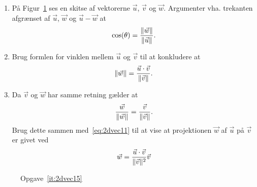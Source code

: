 \begin{enumerate}
	\begin{enumerate}
		\item På Figur~\ref{fig:2dvec15} ses en skitse af vektorerne $\vec{u}$, $\vec{v}$ og $\vec{w}$. Argumenter vha. trekanten afgrænset af $\vec{u}$, $\vec{w}$ og $\vec{u}-\vec{w}$ at 
		\begin{align*}
		\cos(\theta)=\frac{\Vert \vec{w}\Vert}{\Vert \vec{u}\Vert}.
		\end{align*}
		
		\item Brug formlen for vinklen mellem $\vec{u}$ og $\vec{v}$ til at konkludere at 
		\begin{align}\label{eq:2dvec11}
		\Vert \vec{w}\Vert =\frac{\vec{u}\cdot \vec{v}}{\Vert \vec{v}\Vert}.
		\end{align}
		
		\item Da $\vec{v}$ og $\vec{w}$ har samme retning gælder at
		\begin{align*}
		\frac{\vec{w}}{\Vert \vec{w}\Vert}=\frac{\vec{v}}{\Vert \vec{v}\Vert}.
		\end{align*}
		Brug dette sammen med~\eqref{eq:2dvec11} til at vise at projektionen $\vec{w}$ af $\vec{u}$ på $\vec{v}$ er givet ved
		\begin{align*}
		\vec{w}=\frac{\vec{u}\cdot \vec{v}}{\Vert \vec{v}\Vert^2}\vec{v}
		\end{align*}
		
		
	\end{enumerate}
	\begin{figure}
		\centering
		\caption{Opgave~\ref{it:2dvec15}}
		\label{fig:2dvec15}
	\end{figure}
	

\end{enumerate}
